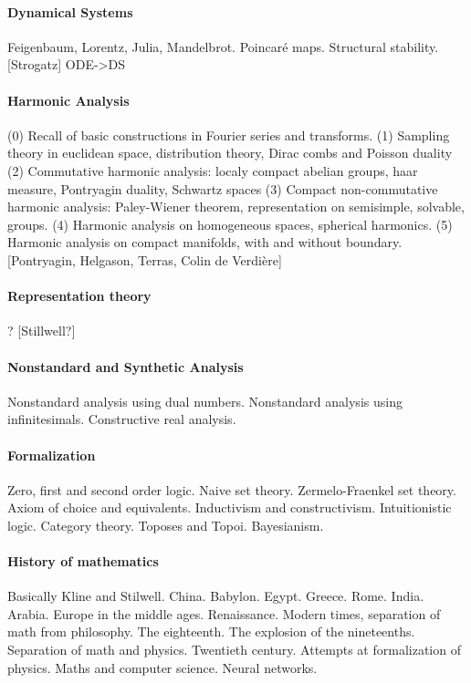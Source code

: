 \paragraph{Dynamical Systems}
Feigenbaum, Lorentz, Julia, Mandelbrot.
Poincaré maps.  Structural stability.
[Strogatz]
{ODE->DS}

\paragraph{Harmonic Analysis}
(0) Recall of basic constructions in Fourier series and transforms.
(1) Sampling theory in euclidean space, distribution theory, Dirac combs and
Poisson duality
(2) Commutative harmonic analysis: localy compact abelian groups, haar
measure, Pontryagin duality, Schwartz spaces
(3) Compact non-commutative harmonic analysis: Paley-Wiener theorem,
representation on semisimple, solvable, groups.
(4) Harmonic analysis on homogeneous spaces, spherical harmonics.
(5) Harmonic analysis on compact manifolds, with and without boundary.
[Pontryagin, Helgason, Terras, Colin de Verdière]


\paragraph{Representation theory}
? [Stillwell?]

\paragraph{Nonstandard and Synthetic Analysis}
Nonstandard analysis using dual numbers.
Nonstandard analysis using infinitesimals.
Constructive real analysis.

\paragraph{Formalization}
Zero, first and second order logic.
Naive set theory.
Zermelo-Fraenkel set theory.
Axiom of choice and equivalents.
Inductivism and constructivism.
Intuitionistic logic.
Category theory.
Toposes and Topoi.
Bayesianism.

\paragraph{History of mathematics}
Basically Kline and Stilwell.
China.  Babylon.  Egypt.  Greece.  Rome.  India.  Arabia.
Europe in the middle ages.
Renaissance.  Modern times, separation of math from philosophy.
The eighteenth.  The explosion of the nineteenths.
Separation of math and physics.
Twentieth century.  Attempts at formalization of physics.
Maths and computer science.  Neural networks.

